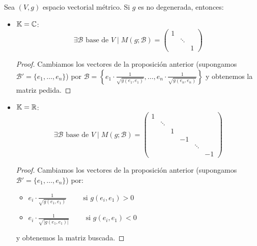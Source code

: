 \begin{prop}
    Sea $(V,g)$ espacio vectorial métrico. Si $g$ es no degenerada, entonces:
    \begin{itemize}
        \item \underline{$\mathbb{K} = \mathbb{C}$}:
        \begin{equation*}
            \exists \mathcal{B} \text{ base de } V \mid M(g; \mathcal{B}) = \left( \begin{array}{ccc}
                1 & & \\
                 & \ddots & \\
                & & 1
            \end{array} \right)
        \end{equation*}
        \begin{proof}
            Cambiamos los vectores de la proposición anterior (supongamos $\mathcal{B}' = \{e_1, \dots, e_n\}$) por $\mathcal{B} = \left\{e_1 \cdot \frac{1}{\sqrt{g(e_1, e_1)}}, \dots, e_n \cdot \frac{1}{\sqrt{g(e_n, e_n)}} \right\}$ y obtenemos la matriz pedida.
        \end{proof}

        \item \underline{$\mathbb{K} = \mathbb{R}$}:
        \begin{equation*}
            \exists \mathcal{B} \text{ base de } V \mid M(g; \mathcal{B}) = \left( \begin{array}{cccccc}
                1 & & && & \\
                 & \ddots & &&& \\
                & & 1 &&& \\
                 &&& -1 &&\\
                 &&&& \ddots & \\
                 &&&&& -1
            \end{array} \right)
        \end{equation*}
        \begin{proof}
            Cambiamos los vectores de la proposición anterior (supongamos $\mathcal{B}' = \{e_1, \dots, e_n\}$) por:
            \begin{itemize}
                \item $e_i \cdot \frac{1}{\sqrt{g(e_1, e_1)}} \qquad \text{ si } g(e_i, e_1) > 0$

                \item $e_i \cdot \frac{1}{\sqrt{\left|g(e_1, e_1)\right|}} \qquad \text{ si } g(e_i, e_1) < 0$
            \end{itemize}
            y obtenemos la matriz buscada.
        \end{proof}
    \end{itemize}
\end{prop}

